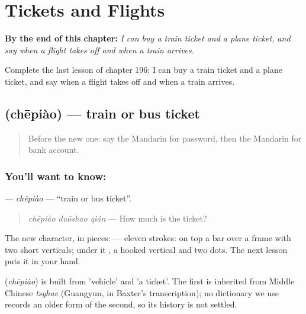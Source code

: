 
\chapter{Tickets and Flights}
\label{ch:zh-tickets-and-flights}

\begin{chapteropening}
\textbf{By the end of this chapter:} \emph{I can buy a train ticket and a plane ticket, and say when a flight takes off and when a train arrives.}

Complete the last lesson of chapter 196: I can buy a train ticket and a plane ticket, and say when a flight takes off and when a train arrives.
\end{chapteropening}

\section[\texorpdfstring{\zh{车票} (chēpiào)}{车票 (chēpiào)}]{ (chēpiào) — train or bus ticket}

\label{lesson:ZH-C196-chepiao}



\begin{quote}
Before the new one: say the Mandarin for password, then the Mandarin for bank account.
\end{quote}

\subsection*{You'll want to know: }
\textbf{} — \emph{chēpiào} — \textquotedblleft{}train or bus ticket\textquotedblright{}.

\begin{quote}
\textbf{} \emph{chēpiào duōshao qián} — How much is the ticket?
\end{quote}

The new character, in pieces:  — eleven strokes: on top a bar over a frame with two short verticals; under it , a hooked vertical and two dots. The next lesson puts it in your hand.

\begin{cousinweb}
\textbf{} (\emph{chēpiào}) is built from  'vehicle' and  'a ticket'. The first is inherited from Middle Chinese \emph{tsyhae} (Guangyun, in Baxter's transcription); no dictionary we use records an older form of the second, so its history is not settled.
\end{cousinweb}

